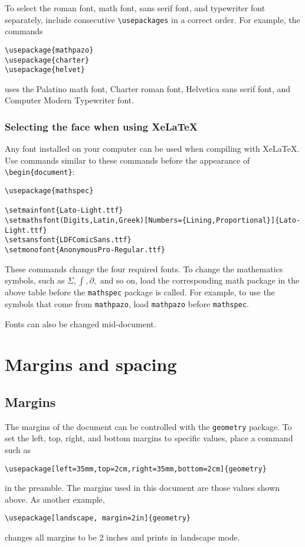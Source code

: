 \documentclass[11pt]{article}
\theoremstyle{definition}
\begin{document}
To select the roman font, math font, sans serif font, and typewriter font separately,
include consecutive \verb~\usepackages~ in a correct order.  For example, the commands
\begin{verbatim}
\usepackage{mathpazo}
\usepackage{charter}
\usepackage{helvet}
\end{verbatim}
uses the Palatino math font, Charter roman font, Helvetica sans serif font,
and Computer Modern Typewriter font.

\subsubsection{Selecting the face when using XeLaTeX}

Any font installed on your computer can be used when compiling with XeLaTeX.
Use commands similar to these commands before the appearance of
\verb~\begin{document}~:

\begin{verbatim}
\usepackage{mathspec}

\setmainfont{Lato-Light.ttf}
\setmathsfont(Digits,Latin,Greek)[Numbers={Lining,Proportional}]{Lato-Light.ttf}
\setsansfont{LDFComicSans.ttf}
\setmonofont{AnonymousPro-Regular.ttf}
\end{verbatim}

These commands change the four required fonts.  To change the mathematics
symbols, such as \(\displaystyle \Sigma, \int, \partial,\) and so on, load the corresponding
math package in the above table before the \verb~mathspec~ package is called.
For example, to use the symbols that come from \verb~mathpazo~, load
\verb~mathpazo~ before \verb~mathspec~.

{\fontsize{1.5ex}{4ex} Fonts can also be changed
  mid-document.}

\section{Margins and spacing}

\subsection{Margins}

The margins of the document can be controlled with the \verb~geometry~ package.  To
set the left, top, right, and bottom margins to specific values, place a command such
as
\begin{verbatim}
\usepackage[left=35mm,top=2cm,right=35mm,bottom=2cm]{geometry}
\end{verbatim}
in the preamble.  The margins used in this document are those values shown above.  As
another example,
\begin{verbatim}
\usepackage[landscape, margin=2in]{geometry}
\end{verbatim}
changes all margins to be 2 inches and prints in landscape mode.
\end{document}
